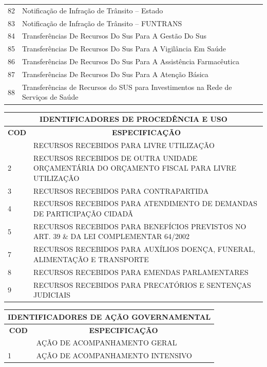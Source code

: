 \documentclass{article} %
\begin{document}
\begin{longtable}[c]{m{1cm}|m{11cm}}
82 & Notificação de Infração de Trânsito – Estado \\
83 & Notificação de Infração de Trânsito – FUNTRANS \\
84 & Transferências De Recursos Do Sus Para A Gestão Do Sus \\
85 & Transferências De Recursos Do Sus Para A Vigilância Em Saúde \\
86 & Transferências De Recursos Do Sus Para A Assistência Farmacêutica \\
87 & Transferências De Recursos Do Sus Para A Atenção Básica \\
88 & Transferências de Recursos do SUS para Investimentos na Rede de Serviços de Saúde \\


 \end{longtable}

\noindent\begin{longtable}[c]{m{1cm}|m{11cm}}

\multicolumn{2}{c}{\cellcolor{gray!50} \textcolor{vermelhoTitulo} {\normalsize \textbf{IDENTIFICADORES DE PROCEDÊNCIA E USO}}}\Tstrut  \\[2ex]
\hline\hline
 \multicolumn{1}{c|}{\textbf{COD}} & \multicolumn{1}{c}{\textbf{ESPECIFICAÇÃO}} \\

\hline
 \endfirsthead
 \hline
 \endhead
 \endfoot

 \hline\hline\hline
 \endlastfoot
 1 & RECURSOS RECEBIDOS PARA LIVRE UTILIZAÇÃO\\
2 & RECURSOS RECEBIDOS DE OUTRA UNIDADE ORÇAMENTÁRIA DO ORÇAMENTO FISCAL PARA LIVRE UTILIZAÇÃO\\
3 & RECURSOS RECEBIDOS PARA CONTRAPARTIDA\\
4 & RECURSOS RECEBIDOS PARA ATENDIMENTO DE DEMANDAS DE PARTICIPAÇÃO CIDADÃ\\
5 & RECURSOS RECEBIDOS PARA BENEFÍCIOS PREVISTOS NO ART. 39 \& DA LEI COMPLEMENTAR 64/2002\\
7 & RECURSOS RECEBIDOS PARA AUXÍLIOS DOENÇA, FUNERAL, ALIMENTAÇÃO E TRANSPORTE\\
8 & RECURSOS RECEBIDOS PARA EMENDAS PARLAMENTARES\\
9 & RECURSOS RECEBIDOS PARA PRECATÓRIOS E SENTENÇAS JUDICIAIS\\
\end{longtable}

\noindent\begin{longtable}[c]{m{1cm}|m{11cm}}

\multicolumn{2}{c}{\cellcolor{gray!50} \textcolor{vermelhoTitulo} {\normalsize \textbf{IDENTIFICADORES DE AÇÃO GOVERNAMENTAL}}}\Tstrut  \\[2ex]
\hline\hline
 \multicolumn{1}{c|}{\textbf{COD}} & \multicolumn{1}{c}{\textbf{ESPECIFICAÇÃO}} \\

\hline
 \endfirsthead
 \hline
 \endhead
 \endfoot
 \hline\hline\hline
 \endlastfoot
0 & AÇÃO DE ACOMPANHAMENTO GERAL\\
1 & AÇÃO DE ACOMPANHAMENTO INTENSIVO\\
 \end{longtable}
 
    
\end{document}
